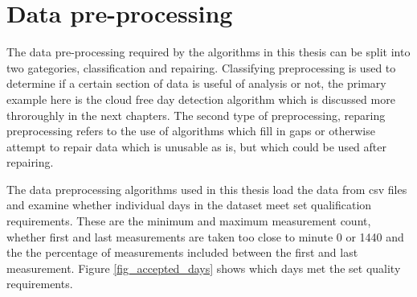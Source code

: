 \newpage
\section{Data pre-processing}
The data pre-processing required by the algorithms in this thesis can be split into two gategories, classification and repairing. Classifying preprocessing is used to determine if a certain section of data is useful of analysis or not, the primary example here is the cloud free day detection algorithm which is discussed more throroughly in the next chapters. The second type of preprocessing, reparing preprocessing refers to the use of algorithms which fill in gaps or otherwise attempt to repair data which is unusable as is, but which could be used after repairing.



The data preprocessing algorithms used in this thesis load the data from csv files and examine whether individual days in the dataset meet set qualification requirements. These are the minimum and maximum measurement count, whether first and last measurements are taken too close to minute 0 or 1440 and the the percentage of measurements included between the first and last measurement. Figure \ref{fig_accepted_days} shows which days met the set quality requirements.



